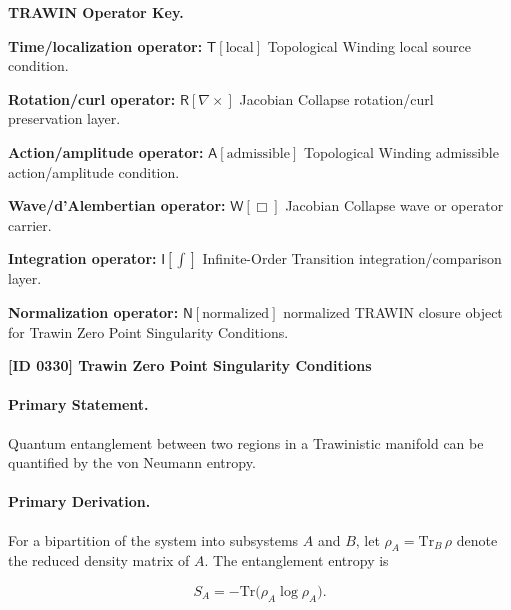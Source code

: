 \par\vspace{0.45\baselineskip}
\noindent\begin{minipage}[t]{\linewidth}
\begingroup
\small
\raggedright
\textbf{TRAWIN Operator Key.}\par
\noindent\textbf{Time/localization operator:} $\mathsf{T}\!\left[\mathrm{local}\right]$ Topological Winding local source condition.\par
\noindent\textbf{Rotation/curl operator:} $\mathsf{R}\!\left[\nabla\times\right]$ Jacobian Collapse rotation/curl preservation layer.\par
\noindent\textbf{Action/amplitude operator:} $\mathsf{A}\!\left[\mathrm{admissible}\right]$ Topological Winding admissible action/amplitude condition.\par
\noindent\textbf{Wave/d'Alembertian operator:} $\mathsf{W}\!\left[\Box\right]$ Jacobian Collapse wave or operator carrier.\par
\noindent\textbf{Integration operator:} $\mathsf{I}\!\left[\int\right]$ Infinite-Order Transition integration/comparison layer.\par
\noindent\textbf{Normalization operator:} $\mathsf{N}\!\left[\mathrm{normalized}\right]$ normalized TRAWIN closure object for Trawin Zero Point Singularity Conditions.\par
\endgroup
\end{minipage}

\clearpage
\noindent\textbf{[ID 0330] Trawin Zero Point Singularity Conditions}\par
\vspace{0.35em}
\paragraph{Primary Statement.}

Quantum entanglement between two regions in a Trawinistic manifold can be quantified by the von Neumann entropy.

\paragraph{Primary Derivation.}

For a bipartition of the system into subsystems $A$ and $B$, let $\rho_A = \mathrm{Tr}_B\,\rho$ denote the reduced density matrix of $A$.  The entanglement entropy is

\begin{equation}
S_A = -\mathrm{Tr}\big( \rho_A\log\rho_A \big).
\end{equation}

